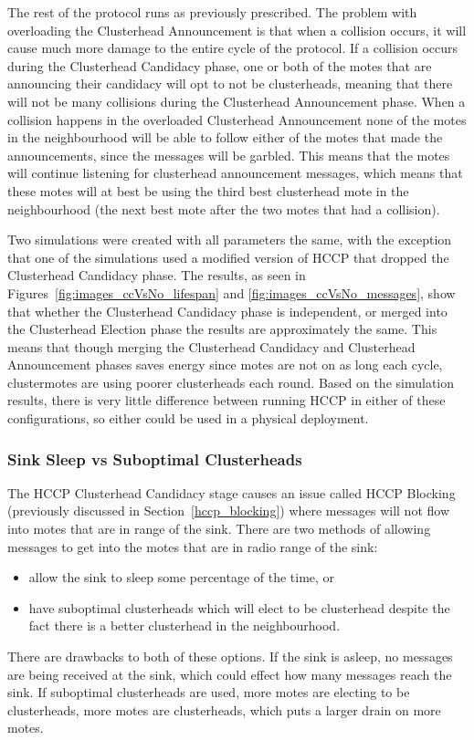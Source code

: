The rest of the protocol runs as previously prescribed. The problem with overloading the Clusterhead Announcement is that when
a collision occurs, it will cause much more damage to the entire cycle of the protocol. If a collision occurs during the 
Clusterhead Candidacy phase, one or both of the motes that are announcing their candidacy will opt to not be clusterheads, 
meaning that there will not be many collisions during the Clusterhead Announcement phase. When a collision happens in the
overloaded Clusterhead Announcement none of the motes in the neighbourhood will be able to follow either of the
motes that made the announcements, since the messages will be garbled. This means that the motes will continue listening for
clusterhead announcement messages, which means that these motes will at best be using the third best clusterhead mote in the neighbourhood (the next best
mote after the two motes that had a collision).

Two simulations were created with all parameters the same, with the exception that one of the simulations 
used a modified version of HCCP that dropped the Clusterhead Candidacy phase. The results, as seen
in Figures~\ref{fig:images_ccVsNo_lifespan} and \ref{fig:images_ccVsNo_messages}, show that whether the Clusterhead
Candidacy phase is independent, or merged into the Clusterhead Election phase the results are approximately 
the same. This means that though merging the Clusterhead Candidacy and Clusterhead Announcement phases saves
energy since motes are not on as long each cycle, clustermotes are using poorer clusterheads each round.
Based on the simulation results, 
there is very little difference between running HCCP in either of these configurations, so either could be used in 
a physical deployment. 




\subsubsection{Sink Sleep vs Suboptimal Clusterheads}

The HCCP Clusterhead Candidacy stage causes an issue called HCCP Blocking (previously discussed in 
Section~\ref{hccp_blocking}) where messages will not flow into 
motes that are in range of the sink. There are two methods of allowing messages to get into the
motes that are in radio range of the sink:
\begin{itemize}
    \item allow the sink to sleep some percentage of the time, or
    \item have suboptimal clusterheads which will elect to be clusterhead despite the fact there is a better clusterhead in the neighbourhood. 
\end{itemize}
There are drawbacks to both of these options. If the sink is asleep, no messages are being received at the sink, which could effect how
many messages reach the sink. If suboptimal clusterheads are used, more motes are electing to 
be clusterheads, more motes are clusterheads, which puts a larger drain on more motes.


